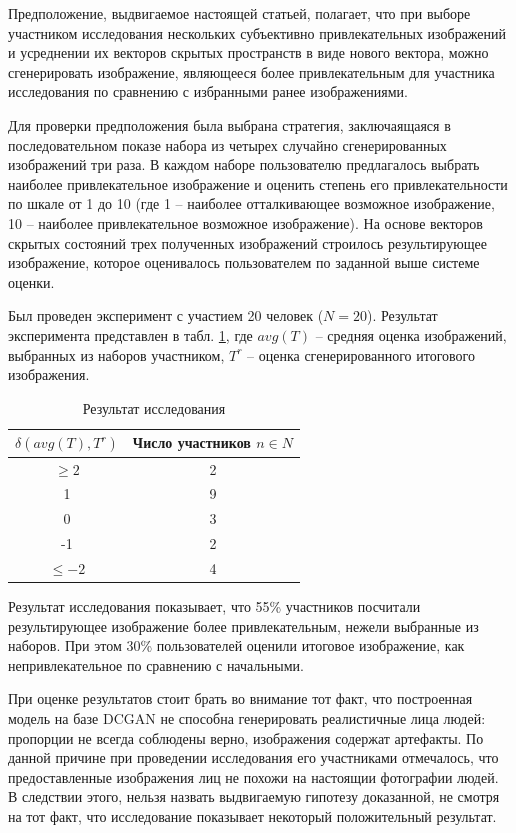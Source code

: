 \documentclass[60x84/16,8pt]{ittmm}
\begin{document}
Предположение, выдвигаемое настоящей статьей, полагает, что при выборе участником исследования
нескольких субъективно привлекательных изображений и усреднении их векторов скрытых
пространств в виде нового вектора, можно сгенерировать изображение,
являющееся более привлекательным для участника исследования по сравнению с избранными ранее
изображениями.

Для проверки предположения была выбрана стратегия, заключаящаяся в последовательном показе набора из четырех
случайно сгенерированных изображений три раза. В каждом наборе пользователю предлагалось выбрать
наиболее привлекательное изображение и оценить степень его привлекательности по шкале от 1 до 10
(где 1 -- наиболее отталкивающее возможное изображение, 10 -- наиболее привлекательное возможное изображение).
На основе векторов скрытых состояний трех полученных изображений строилось результирующее изображение,
которое оценивалось пользователем по заданной выше системе оценки.

Был проведен эксперимент с участием 20 человек (\(N = 20\)).
Результат эксперимента представлен в табл. \ref{tab:experiment},
где \(avg(T)\) -- средняя оценка изображений, выбранных из наборов участником,
\(T^r\) -- оценка сгенерированного итогового изображения.

\begin{table}
  \centering
  \caption{Результат исследования}
  \label{tab:experiment}
  \begin{tabular}{|c|c|}
    \hline
    \(\delta (avg(T), T^r)\) & Число участников \(n \in N\) \\
    \hline
    \(\ge 2\) & 2 \\
    1         & 9 \\
    0         & 3 \\
    -1        & 2 \\
    \(\le -2\)& 4 \\
    \hline
  \end{tabular}
\end{table}

Результат исследования показывает, что 55\% участников посчитали результирующее
изображение более привлекательным, нежели выбранные из наборов.
При этом 30\% пользователей оценили итоговое изображение, как
непривлекательное по сравнению с начальными.

При оценке результатов стоит брать во внимание тот факт, что
построенная модель на базе DCGAN не способна генерировать
реалистичные лица людей: пропорции не всегда соблюдены верно,
изображения содержат артефакты. По данной причине при проведении
исследования его участниками отмечалось, что предоставленные изображения
лиц не похожи на настоящии фотографии людей. В следствии этого,
нельзя назвать выдвигаемую гипотезу доказанной, не смотря на тот факт,
что исследование показывает некоторый положительный результат.
\end{document}
